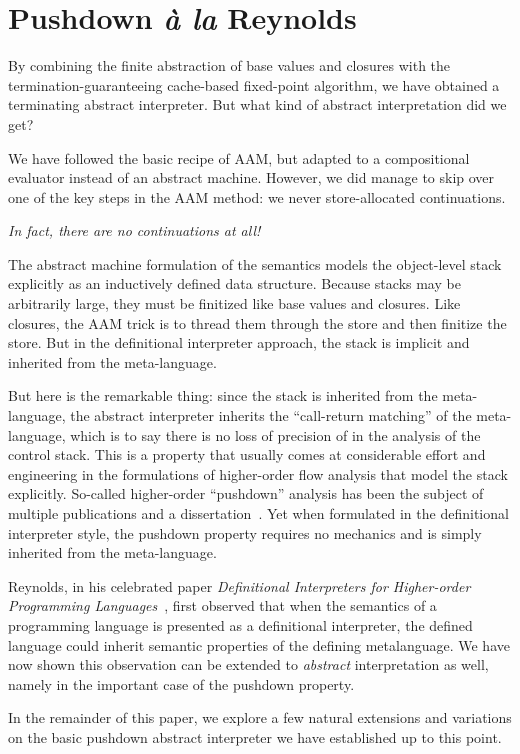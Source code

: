 \section{Pushdown \emph{à la} Reynolds}\label{s:reynolds}

By combining the finite abstraction of base values and closures with the
termination-guaranteeing cache-based fixed-point algorithm, we have obtained a
terminating abstract interpreter.  But what kind of abstract interpretation did
we get?

We have followed the basic recipe of AAM, but adapted to a compositional
evaluator instead of an abstract machine.  However, we did manage to skip over
one of the key steps in the AAM method: we never store-allocated continuations.
\begin{center}
\emph{In fact, there are no continuations at all!}
\end{center}
The abstract machine formulation of the semantics models the object-level stack
explicitly as an inductively defined data structure.  Because stacks may be
arbitrarily large, they must be finitized like base values and closures.  Like
closures, the AAM trick is to thread them through the store and then finitize
the store.  But in the definitional interpreter approach, the stack is implicit
and inherited from the meta-language.

But here is the remarkable thing: since the stack is inherited from the
meta-language, the abstract interpreter inherits the ``call-return matching''
of the meta-language, which is to say there is no loss of precision of in the
analysis of the control stack.  This is a property that usually comes at
considerable effort and engineering in the formulations of higher-order flow
analysis that model the stack explicitly.  So-called higher-order ``pushdown''
analysis has been the subject of multiple publications and a
dissertation~\cite%
{dvanhorn:Vardoulakis2011CFA2%
,dvanhorn:Earl2010Pushdown%
,local:vardoulakis-diss12%
,dvanhorn:VanHorn2012Systematic%
,dvanhorn:Earl2012Introspective%
,dvanhorn:Johnson2014Abstracting%
,dvanhorn:Johnson2014Pushdown%
,local:p4f%
}. Yet when formulated in the definitional interpreter style, the pushdown
property requires no mechanics and is simply inherited from the meta-language.

Reynolds, in his celebrated paper \emph{Definitional Interpreters for
Higher-order Programming Languages}~\cite{dvanhorn:reynolds-acm72}, first
observed that when the semantics of a programming language is presented as a
definitional interpreter, the defined language could inherit semantic
properties of the defining metalanguage.  We have now shown this observation
can be extended to \emph{abstract} interpretation as well, namely in the
important case of the pushdown property.

In the remainder of this paper, we explore a few natural extensions and
variations on the basic pushdown abstract interpreter we have established up to
this point.
